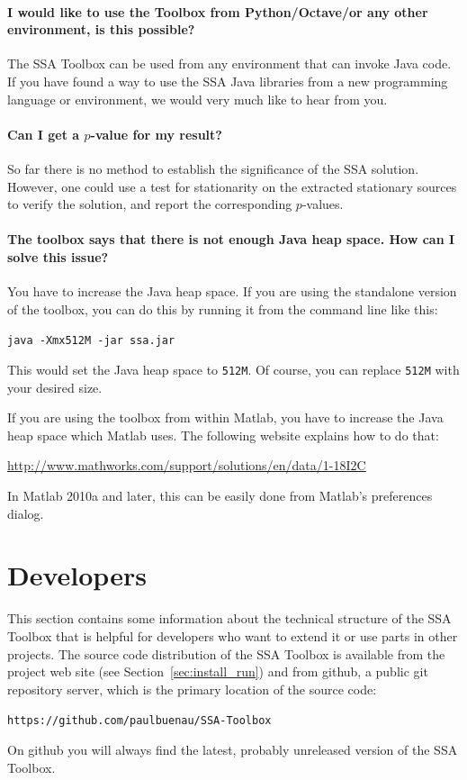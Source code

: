 \documentclass{article}
\newcommand{\1}{\ensuremath{\mathds{1}}}
\newcommand{\0}{\ensuremath{0}}
\begin{document}
\paragraph{I would like to use the Toolbox from Python/Octave/or any other environment, is this possible?} 
The SSA Toolbox can be used from any environment that can invoke Java code. If you have found a way
to use the SSA Java libraries from a new programming language or environment, we would very much like
to hear from you.

\paragraph{Can I get a $p$-value for my result?} So far there is no method to establish the 
significance of the SSA solution. However, one could use a test for stationarity on the
extracted stationary sources to verify the solution, and report the corresponding $p$-values.

\paragraph{The toolbox says that there is not enough Java heap space. How can I solve this issue?}
You have to increase the Java heap space. If you are using the standalone version of the toolbox, you can
do this by running it from the command line like this:
\begin{center}
\texttt{java -Xmx512M -jar ssa.jar}
\end{center}
This would set the Java heap space to \texttt{512M}. Of course, you can replace \texttt{512M} with your
desired size.

If you are using the toolbox from within Matlab, you have to increase the Java heap space which Matlab uses.
The following website explains how to do that:
\begin{center}
    \url{http://www.mathworks.com/support/solutions/en/data/1-18I2C}
\end{center}
In Matlab 2010a and later, this can be easily done from Matlab's preferences dialog.

\section{Developers}
\label{sec:dev}

This section contains some information about the technical structure of the SSA Toolbox
that is helpful for developers who want to extend it or use parts in other projects. The 
source code distribution of the SSA Toolbox is available from the project 
web site (see Section~\ref{sec:install_run}) and from github, a public git repository 
server, which is the primary location of the source code:
\begin{center}
	\texttt{https://github.com/paulbuenau/SSA-Toolbox}
\end{center}
On github you will always find the latest, probably unreleased version of the SSA Toolbox.
\end{document}
